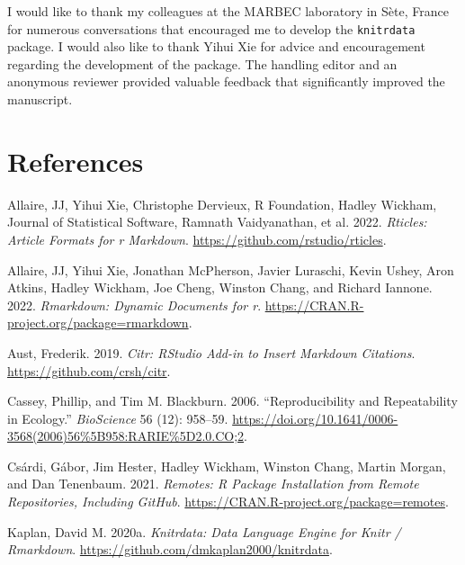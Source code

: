 I would like to thank my colleagues at the MARBEC laboratory in Sète, France for numerous conversations that encouraged me to develop the \texttt{knitrdata} package. I would also like to thank Yihui Xie for advice and encouragement regarding the development of the package. The handling editor and an anonymous reviewer provided valuable feedback that significantly improved the manuscript.

\hypertarget{references}{%
\section*{References}\label{references}}

\hypertarget{refs}{}
\begin{CSLReferences}{1}{0}
\leavevmode{}%
Allaire, JJ, Yihui Xie, Christophe Dervieux, R Foundation, Hadley Wickham, Journal of Statistical Software, Ramnath Vaidyanathan, et al. 2022. \emph{Rticles: Article Formats for r Markdown}. \url{https://github.com/rstudio/rticles}.

\leavevmode{}%
Allaire, JJ, Yihui Xie, Jonathan McPherson, Javier Luraschi, Kevin Ushey, Aron Atkins, Hadley Wickham, Joe Cheng, Winston Chang, and Richard Iannone. 2022. \emph{Rmarkdown: Dynamic Documents for r}. \url{https://CRAN.R-project.org/package=rmarkdown}.

\leavevmode{}%
Aust, Frederik. 2019. \emph{Citr: RStudio Add-in to Insert Markdown Citations}. \url{https://github.com/crsh/citr}.

\leavevmode{}%
Cassey, Phillip, and Tim M. Blackburn. 2006. {``Reproducibility and {Repeatability} in {Ecology}.''} \emph{BioScience} 56 (12): 958--59. \url{https://doi.org/10.1641/0006-3568(2006)56\%5B958:RARIE\%5D2.0.CO;2}.

\leavevmode{}%
Csárdi, Gábor, Jim Hester, Hadley Wickham, Winston Chang, Martin Morgan, and Dan Tenenbaum. 2021. \emph{Remotes: R Package Installation from Remote Repositories, Including GitHub}. \url{https://CRAN.R-project.org/package=remotes}.

\leavevmode{}%
Kaplan, David M. 2020a. \emph{Knitrdata: Data Language Engine for Knitr / Rmarkdown}. \url{https://github.com/dmkaplan2000/knitrdata}.


\end{CSLReferences}
